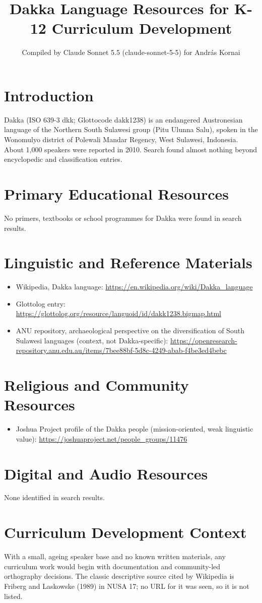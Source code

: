 \documentclass[12pt]{article}
\title{Dakka Language Resources for K-12 Curriculum Development}
\author{Compiled by Claude Sonnet 5.5 (claude-sonnet-5-5) for Andr\'as Kornai}
\date{}
\begin{document}
\maketitle

\section{Introduction}
Dakka (ISO 639-3 dkk; Glottocode dakk1238) is an endangered Austronesian language of the Northern South Sulawesi group (Pitu Ulunna Salu), spoken in the Wonomulyo district of Polewali Mandar Regency, West Sulawesi, Indonesia. About 1,000 speakers were reported in 2010. Search found almost nothing beyond encyclopedic and classification entries.

\section{Primary Educational Resources}
No primers, textbooks or school programmes for Dakka were found in search results.

\section{Linguistic and Reference Materials}
\begin{itemize}
\item Wikipedia, Dakka language: \url{https://en.wikipedia.org/wiki/Dakka_language}
\item Glottolog entry: \url{https://glottolog.org/resource/languoid/id/dakk1238.bigmap.html}
\item ANU repository, archaeological perspective on the diversification of South Sulawesi languages (context, not Dakka-specific): \url{https://openresearch-repository.anu.edu.au/items/7bee88bf-5d8c-4249-abab-f4be3ed4bebc}
\end{itemize}

\section{Religious and Community Resources}
\begin{itemize}
\item Joshua Project profile of the Dakka people (mission-oriented, weak linguistic value): \url{https://joshuaproject.net/people_groups/11476}
\end{itemize}

\section{Digital and Audio Resources}
None identified in search results.

\section{Curriculum Development Context}
With a small, ageing speaker base and no known written materials, any curriculum work would begin with documentation and community-led orthography decisions. The classic descriptive source cited by Wikipedia is Friberg and Laskowske (1989) in NUSA 17; no URL for it was seen, so it is not listed.
\end{document}
